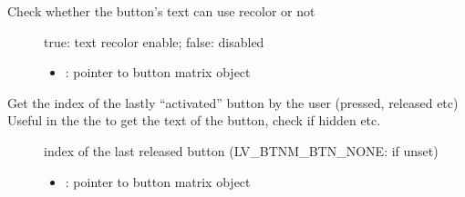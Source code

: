 \documentclass[letterpaper,10pt,english]{sphinxmanual}
\begin{document}

\begin{fulllineitems}
\label{\detokenize{object-types/btnm:_CPPv419lv_btnm_get_recolorPK8lv_obj_t}}%
\pysigstartmultiline
{}\label{\detokenize{object-types/btnm:lv__btnm_8h_1ae801c03efd7beb3606729e47f349eede}}%
\pysigstopmultiline
Check whether the button’s text can use recolor or not \begin{description}
\item[{}] \leavevmode
true: text recolor enable; false: disabled 

\item[{}] \leavevmode\begin{itemize}
\item {} 
: pointer to button matrix object 

\end{itemize}

\end{description}


\end{fulllineitems}


\begin{fulllineitems}
\label{\detokenize{object-types/btnm:_CPPv422lv_btnm_get_active_btnPK8lv_obj_t}}%
\pysigstartmultiline
{}\label{\detokenize{object-types/btnm:lv__btnm_8h_1a428ad43259da835405bd4301277ddd03}}%
\pysigstopmultiline
Get the index of the lastly “activated” button by the user (pressed, released etc) Useful in the the  to get the text of the button, check if hidden etc. \begin{description}
\item[{}] \leavevmode
index of the last released button (LV\_BTNM\_BTN\_NONE: if unset) 

\item[{}] \leavevmode\begin{itemize}
\item {} 
: pointer to button matrix object 

\end{itemize}

\end{description}


\end{fulllineitems}
\end{document}
